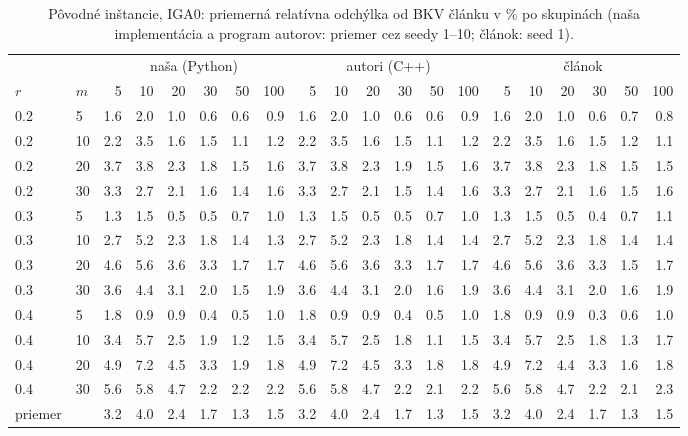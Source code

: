 \begin{table}[ht]
\centering
\scriptsize
\setlength{\tabcolsep}{3pt}
\caption{Pôvodné inštancie, IGA0: priemerná relatívna odchýlka od BKV článku v \% po skupinách (naša implementácia a program autorov: priemer cez seedy 1--10; článok: seed 1).}
\label{tab:orig_rpd_iga0}
\begin{tabular}{ll|rrrrrr|rrrrrr|rrrrrr}
\toprule
 &  & \multicolumn{6}{c}{naša (Python)} & \multicolumn{6}{c}{autori (C++)} & \multicolumn{6}{c}{článok} \\
$r$ & $m$ & 5 & 10 & 20 & 30 & 50 & 100 & 5 & 10 & 20 & 30 & 50 & 100 & 5 & 10 & 20 & 30 & 50 & 100 \\
\midrule
0.2 & 5 & 1.6 & 2.0 & 1.0 & 0.6 & 0.6 & 0.9 & 1.6 & 2.0 & 1.0 & 0.6 & 0.6 & 0.9 & 1.6 & 2.0 & 1.0 & 0.6 & 0.7 & 0.8 \\
0.2 & 10 & 2.2 & 3.5 & 1.6 & 1.5 & 1.1 & 1.2 & 2.2 & 3.5 & 1.6 & 1.5 & 1.1 & 1.2 & 2.2 & 3.5 & 1.6 & 1.5 & 1.2 & 1.1 \\
0.2 & 20 & 3.7 & 3.8 & 2.3 & 1.8 & 1.5 & 1.6 & 3.7 & 3.8 & 2.3 & 1.9 & 1.5 & 1.6 & 3.7 & 3.8 & 2.3 & 1.8 & 1.5 & 1.5 \\
0.2 & 30 & 3.3 & 2.7 & 2.1 & 1.6 & 1.4 & 1.6 & 3.3 & 2.7 & 2.1 & 1.5 & 1.4 & 1.6 & 3.3 & 2.7 & 2.1 & 1.6 & 1.5 & 1.6 \\
0.3 & 5 & 1.3 & 1.5 & 0.5 & 0.5 & 0.7 & 1.0 & 1.3 & 1.5 & 0.5 & 0.5 & 0.7 & 1.0 & 1.3 & 1.5 & 0.5 & 0.4 & 0.7 & 1.1 \\
0.3 & 10 & 2.7 & 5.2 & 2.3 & 1.8 & 1.4 & 1.3 & 2.7 & 5.2 & 2.3 & 1.8 & 1.4 & 1.4 & 2.7 & 5.2 & 2.3 & 1.8 & 1.4 & 1.4 \\
0.3 & 20 & 4.6 & 5.6 & 3.6 & 3.3 & 1.7 & 1.7 & 4.6 & 5.6 & 3.6 & 3.3 & 1.7 & 1.7 & 4.6 & 5.6 & 3.6 & 3.3 & 1.5 & 1.7 \\
0.3 & 30 & 3.6 & 4.4 & 3.1 & 2.0 & 1.5 & 1.9 & 3.6 & 4.4 & 3.1 & 2.0 & 1.6 & 1.9 & 3.6 & 4.4 & 3.1 & 2.0 & 1.6 & 1.9 \\
0.4 & 5 & 1.8 & 0.9 & 0.9 & 0.4 & 0.5 & 1.0 & 1.8 & 0.9 & 0.9 & 0.4 & 0.5 & 1.0 & 1.8 & 0.9 & 0.9 & 0.3 & 0.6 & 1.0 \\
0.4 & 10 & 3.4 & 5.7 & 2.5 & 1.9 & 1.2 & 1.5 & 3.4 & 5.7 & 2.5 & 1.8 & 1.1 & 1.5 & 3.4 & 5.7 & 2.5 & 1.8 & 1.3 & 1.7 \\
0.4 & 20 & 4.9 & 7.2 & 4.5 & 3.3 & 1.9 & 1.8 & 4.9 & 7.2 & 4.5 & 3.3 & 1.8 & 1.8 & 4.9 & 7.2 & 4.4 & 3.3 & 1.6 & 1.8 \\
0.4 & 30 & 5.6 & 5.8 & 4.7 & 2.2 & 2.2 & 2.2 & 5.6 & 5.8 & 4.7 & 2.2 & 2.1 & 2.2 & 5.6 & 5.8 & 4.7 & 2.2 & 2.1 & 2.3 \\
\midrule
priemer &  & 3.2 & 4.0 & 2.4 & 1.7 & 1.3 & 1.5 & 3.2 & 4.0 & 2.4 & 1.7 & 1.3 & 1.5 & 3.2 & 4.0 & 2.4 & 1.7 & 1.3 & 1.5 \\
\bottomrule
\end{tabular}
\end{table}
